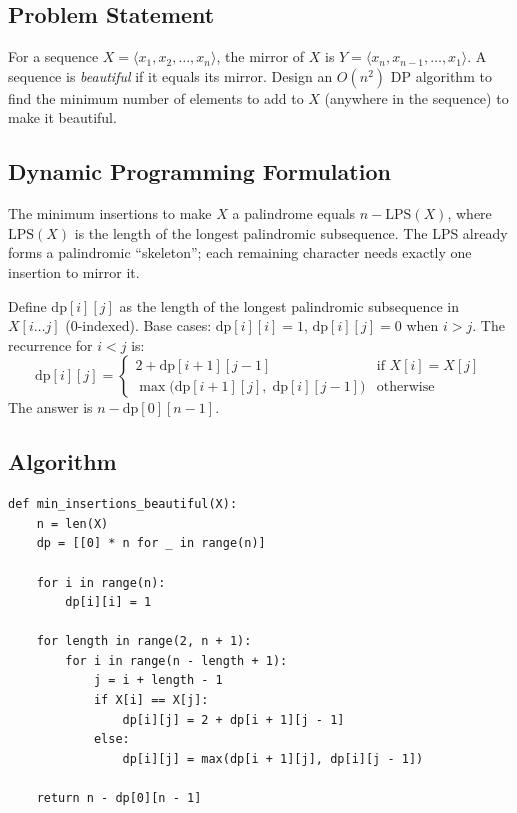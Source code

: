 \documentclass[12pt,a4paper]{article}
\begin{document}
\subsection*{Problem Statement}
For a sequence $X = \langle x_1, x_2, \ldots, x_n \rangle$, the mirror of $X$ is $Y = \langle x_n, x_{n-1}, \ldots, x_1 \rangle$. A sequence is \textit{beautiful} if it equals its mirror. Design an $O(n^2)$ DP algorithm to find the minimum number of elements to add to $X$ (anywhere in the sequence) to make it beautiful.

\subsection*{Dynamic Programming Formulation}

The minimum insertions to make $X$ a palindrome equals $n - \text{LPS}(X)$, where $\text{LPS}(X)$ is the length of the longest palindromic subsequence. The LPS already forms a palindromic ``skeleton''; each remaining character needs exactly one insertion to mirror it.

Define $\text{dp}[i][j]$ as the length of the longest palindromic subsequence in $X[i \ldots j]$ (0-indexed). Base cases: $\text{dp}[i][i] = 1$, $\text{dp}[i][j] = 0$ when $i > j$. The recurrence for $i < j$ is:
\[
    \text{dp}[i][j] = \begin{cases}
        2 + \text{dp}[i+1][j-1] & \text{if } X[i] = X[j] \\[4pt]
        \max\!\big(\text{dp}[i+1][j],\; \text{dp}[i][j-1]\big) & \text{otherwise}
    \end{cases}
\]
The answer is $n - \text{dp}[0][n-1]$.

\subsection*{Algorithm}

\begin{verbatim}
def min_insertions_beautiful(X):
    n = len(X)
    dp = [[0] * n for _ in range(n)]

    for i in range(n):
        dp[i][i] = 1

    for length in range(2, n + 1):
        for i in range(n - length + 1):
            j = i + length - 1
            if X[i] == X[j]:
                dp[i][j] = 2 + dp[i + 1][j - 1]
            else:
                dp[i][j] = max(dp[i + 1][j], dp[i][j - 1])

    return n - dp[0][n - 1]
\end{verbatim}
\end{document}
